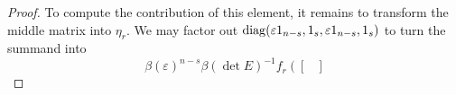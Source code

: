 \begin{proof}
	To compute the contribution of this element, it remains to transform the middle matrix into $\eta_r$. We may factor out $\operatorname{diag}(\varepsilon1_{n-s},1_s,\varepsilon1_{n-s},1_s)$ to turn the summand into
    \[\beta(\varepsilon)^{n-s}\beta(\det E)^{-1}f_r\left(\begin{bmatrix}

\end{bmatrix}\]
\end{proof}

